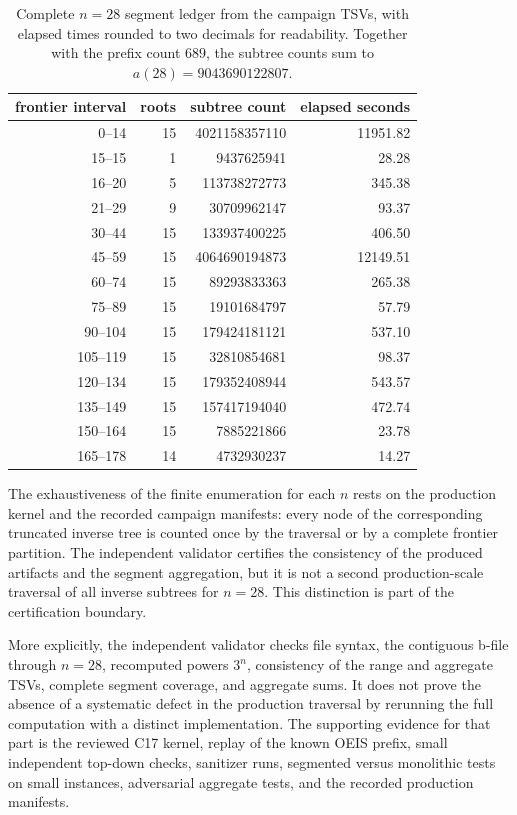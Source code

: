 \documentclass[11pt]{article}
\theoremstyle{definition}
\theoremstyle{remark}
\begin{document}
\begin{table}[ht]
\centering
\begin{tabular}{rrrr}
\toprule
frontier interval & roots & subtree count & elapsed seconds \\
\midrule
0--14 & 15 & 4021158357110 & 11951.82 \\
15--15 & 1 & 9437625941 & 28.28 \\
16--20 & 5 & 113738272773 & 345.38 \\
21--29 & 9 & 30709962147 & 93.37 \\
30--44 & 15 & 133937400225 & 406.50 \\
45--59 & 15 & 4064690194873 & 12149.51 \\
60--74 & 15 & 89293833363 & 265.38 \\
75--89 & 15 & 19101684797 & 57.79 \\
90--104 & 15 & 179424181121 & 537.10 \\
105--119 & 15 & 32810854681 & 98.37 \\
120--134 & 15 & 179352408944 & 543.57 \\
135--149 & 15 & 157417194040 & 472.74 \\
150--164 & 15 & 7885221866 & 23.78 \\
165--178 & 14 & 4732930237 & 14.27 \\
\bottomrule
\end{tabular}
\caption{Complete \(n=28\) segment ledger from the campaign TSVs, with elapsed
times rounded to two decimals for readability.  Together with the prefix count
\(689\), the subtree counts sum to \(a(28)=9043690122807\).}
\label{tab:n28-segments}
\end{table}

The exhaustiveness of the finite enumeration for each \(n\) rests on the
production kernel and the recorded campaign manifests: every node of the
corresponding truncated inverse tree is counted once by the traversal or by a
complete frontier partition.  The independent validator certifies the
consistency of the produced artifacts and the segment aggregation, but it is
not a second production-scale traversal of all inverse subtrees for \(n=28\).
This distinction is part of the certification boundary.

More explicitly, the independent validator checks file syntax, the contiguous
b-file through \(n=28\), recomputed powers \(3^n\), consistency of the range
and aggregate TSVs, complete segment coverage, and aggregate sums.  It does
not prove the absence of a systematic defect in the production traversal by
rerunning the full computation with a distinct implementation.  The supporting
evidence for that part is the reviewed C17 kernel, replay of the known OEIS
prefix, small independent top-down checks, sanitizer runs, segmented versus
monolithic tests on small instances, adversarial aggregate tests, and the
recorded production manifests.
\end{document}
